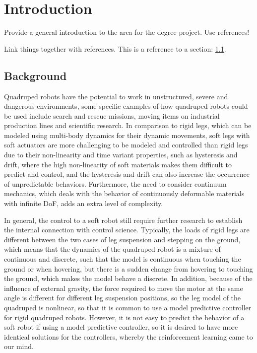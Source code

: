 \chapter{Introduction}

Provide a general introduction to the area for the degree project. Use references!

Link things together with references. This is a reference to a section: \ref{sec:background}.

\section{Background}
\label{sec:background}
Quadruped robots have the potential to work in unstructured, severe and dangerous environments\cite{mengReviewQuadrupedRobots2016}, some specific examples of how quadruped robots could be used include search and rescue missions\cite{hawkesSoftRobotThat2017}, moving items on industrial production lines\cite{gehringANYmalFieldSolving2021} and scientific research\cite{hewingLearningbasedModelPredictive2020}. In comparison to  rigid legs, which can be modeled using multi-body dynamics for their dynamic movements, soft legs with soft actuators are more challenging to be modeled and controlled than rigid legs due to their non-linearity\cite{slotineAppliedNonlinearControl1991} and time variant properties\cite{wangControlStrategiesSoft2022}, such as hysteresis and drift, where the high non-linearity of soft materials makes them difficult to predict and control, and the hysteresis and drift can also increase the occurrence of unpredictable behaviors. Furthermore, the need to consider continuum mechanics, which deals with the behavior of continuously deformable materials with infinite \ac{DoF}\cite{polygerinosSoftRoboticsReview2017}, adds an extra level of complexity. 

In general, the control to a soft robot still require further research to establish the internal connection with control science\cite{wangControlStrategiesSoft2022}. Typically, the loads of rigid legs are different between the two cases of leg suspension and stepping on the ground\cite{biswalDevelopmentQuadrupedWalking2021}, which means that the dynamics of the quadruped robot is a mixture of continuous and discrete, such that the model is continuous when touching the ground or when hovering, but there is a sudden change from hovering to touching the ground, which makes the model behave a discrete. In addition, because of the influence of external gravity, the force required to move the motor at the same angle is different for different leg suspension positions, so the leg model of the quadruped is nonlinear, so that it is common to use a model predictive controller for rigid quadruped robots. However, it is not easy to predict the behavior of a soft robot if using a model predictive controller\cite{BemporadLinearTimevaryingNonlinearMPC}, so it is desired to have more identical solutions for the controllers, whereby the  reinforcement learning came to our mind\cite{hewingLearningbasedModelPredictive2020}. 

